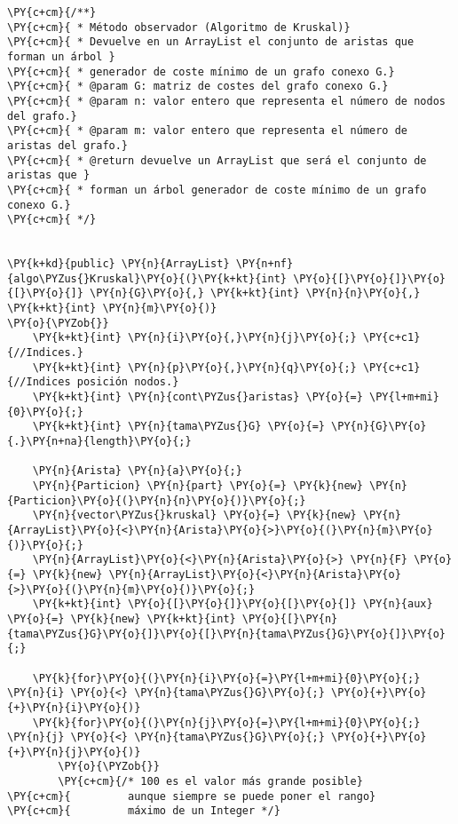 \begin{Verbatim}[commandchars=\\\{\}]
\PY{c+cm}{/**}
\PY{c+cm}{ * Método observador (Algoritmo de Kruskal)}
\PY{c+cm}{ * Devuelve en un ArrayList el conjunto de aristas que forman un árbol }
\PY{c+cm}{ * generador de coste mínimo de un grafo conexo G.}
\PY{c+cm}{ * @param G: matriz de costes del grafo conexo G.}
\PY{c+cm}{ * @param n: valor entero que representa el número de nodos del grafo.}
\PY{c+cm}{ * @param m: valor entero que representa el número de aristas del grafo.}
\PY{c+cm}{ * @return devuelve un ArrayList que será el conjunto de aristas que }
\PY{c+cm}{ * forman un árbol generador de coste mínimo de un grafo conexo G.}
\PY{c+cm}{ */}
 

\PY{k+kd}{public} \PY{n}{ArrayList} \PY{n+nf}{algo\PYZus{}Kruskal}\PY{o}{(}\PY{k+kt}{int} \PY{o}{[}\PY{o}{]}\PY{o}{[}\PY{o}{]} \PY{n}{G}\PY{o}{,} \PY{k+kt}{int} \PY{n}{n}\PY{o}{,} \PY{k+kt}{int} \PY{n}{m}\PY{o}{)}
\PY{o}{\PYZob{}}
    \PY{k+kt}{int} \PY{n}{i}\PY{o}{,}\PY{n}{j}\PY{o}{;} \PY{c+c1}{//Indices.}
    \PY{k+kt}{int} \PY{n}{p}\PY{o}{,}\PY{n}{q}\PY{o}{;} \PY{c+c1}{//Indices posición nodos.}
    \PY{k+kt}{int} \PY{n}{cont\PYZus{}aristas} \PY{o}{=} \PY{l+m+mi}{0}\PY{o}{;}
    \PY{k+kt}{int} \PY{n}{tama\PYZus{}G} \PY{o}{=} \PY{n}{G}\PY{o}{.}\PY{n+na}{length}\PY{o}{;}

    \PY{n}{Arista} \PY{n}{a}\PY{o}{;}
    \PY{n}{Particion} \PY{n}{part} \PY{o}{=} \PY{k}{new} \PY{n}{Particion}\PY{o}{(}\PY{n}{n}\PY{o}{)}\PY{o}{;}
    \PY{n}{vector\PYZus{}kruskal} \PY{o}{=} \PY{k}{new} \PY{n}{ArrayList}\PY{o}{<}\PY{n}{Arista}\PY{o}{>}\PY{o}{(}\PY{n}{m}\PY{o}{)}\PY{o}{;}
    \PY{n}{ArrayList}\PY{o}{<}\PY{n}{Arista}\PY{o}{>} \PY{n}{F} \PY{o}{=} \PY{k}{new} \PY{n}{ArrayList}\PY{o}{<}\PY{n}{Arista}\PY{o}{>}\PY{o}{(}\PY{n}{m}\PY{o}{)}\PY{o}{;}
    \PY{k+kt}{int} \PY{o}{[}\PY{o}{]}\PY{o}{[}\PY{o}{]} \PY{n}{aux} \PY{o}{=} \PY{k}{new} \PY{k+kt}{int} \PY{o}{[}\PY{n}{tama\PYZus{}G}\PY{o}{]}\PY{o}{[}\PY{n}{tama\PYZus{}G}\PY{o}{]}\PY{o}{;}

    \PY{k}{for}\PY{o}{(}\PY{n}{i}\PY{o}{=}\PY{l+m+mi}{0}\PY{o}{;} \PY{n}{i} \PY{o}{<} \PY{n}{tama\PYZus{}G}\PY{o}{;} \PY{o}{+}\PY{o}{+}\PY{n}{i}\PY{o}{)}
	\PY{k}{for}\PY{o}{(}\PY{n}{j}\PY{o}{=}\PY{l+m+mi}{0}\PY{o}{;} \PY{n}{j} \PY{o}{<} \PY{n}{tama\PYZus{}G}\PY{o}{;} \PY{o}{+}\PY{o}{+}\PY{n}{j}\PY{o}{)}
	    \PY{o}{\PYZob{}}
		\PY{c+cm}{/* 100 es el valor más grande posible}
\PY{c+cm}{		   aunque siempre se puede poner el rango}
\PY{c+cm}{		   máximo de un Integer */}


\end{Verbatim}
